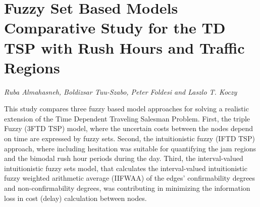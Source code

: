 \documentclass[../booklet.tex]{subfiles}
\begin{document}
\section[Fuzzy Set Based Models Comparative Study for the TD TSP with Rush Hours and Traffic Regions. {\it Ruba Almahasneh, Boldizsar Tuu-Szabo, Peter Foldesi and Laszlo T. Koczy}]{Fuzzy Set Based Models Comparative Study for the TD TSP with Rush Hours and Traffic Regions}
   

\begin{center}
  {\it Ruba Almahasneh, Boldizsar Tuu-Szabo, Peter Foldesi and Laszlo T. Koczy}
\end{center}

\vskip 0.8cm

This study compares three fuzzy based model approaches for solving a realistic extension of the Time Dependent Traveling Salesman Problem. First, the triple Fuzzy (3FTD TSP) model, where the uncertain costs between the nodes depend on time are expressed by fuzzy sets. Second, the intuitionistic fuzzy (IFTD TSP) approach, where including hesitation was suitable for quantifying the jam regions and the bimodal rush hour periods during the day. Third, the interval-valued intuitionistic fuzzy sets model, that calculates the interval-valued intuitionistic fuzzy weighted arithmetic average (IIFWAA) of the edges' confirmability degrees and non-confirmability degrees, was contributing in minimizing the information loss in cost (delay) calculation between nodes.

\end{document}
